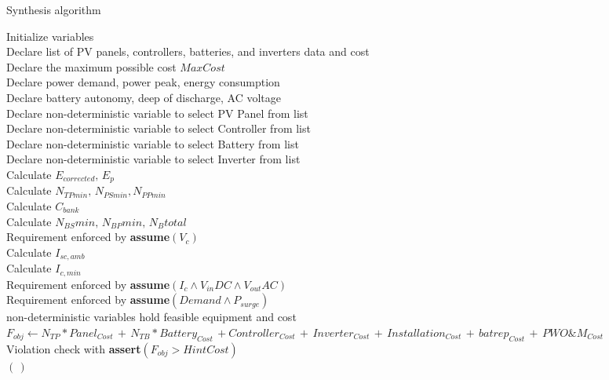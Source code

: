 \documentclass[journal]{IEEEtran}
\begin{document}
 \begin{algorithm}
 \caption{Synthesis algorithm}
 \begin{algorithmic}[1]
 \renewcommand{\algorithmicrequire}{\textbf{Input:}}
 \renewcommand{\algorithmicensure}{\textbf{Output:}}
  \STATE Initialize variables \\
  \STATE Declare list of PV panels, controllers, batteries, and inverters data and cost \\
  \STATE Declare the maximum possible cost $MaxCost$  \\
  \STATE Declare power demand, power peak, energy consumption \\
  \STATE Declare battery autonomy, deep of discharge, AC voltage \\
 	\STATE Declare non-deterministic variable to select PV Panel from list \\
 	\STATE Declare non-deterministic variable to select Controller from list \\
 	\STATE Declare non-deterministic variable to select Battery from list \\
 	\STATE Declare non-deterministic variable to select Inverter from list \\ 	
 	\STATE Calculate $E_{corrected}, \, E_{p} $ \\
	\STATE Calculate $N_{TPmin}, \, N_{PSmin}, N_{PPmin} $ \\
 	\STATE Calculate $C_{bank}$ \\
	\STATE Calculate $N_{BS}min, \, N_{BP}min, \, N_{B}total$ \\
	\STATE Requirement enforced by \textbf{assume}$(V_{c})$ \\
 	\STATE Calculate $I_{sc,amb}$ \\
 	\STATE Calculate $I_{c,min}$ \\
 	\STATE Requirement enforced by \textbf{assume}$(I_{c} \wedge V_{in}DC \wedge V_{out}AC)$ \\
	\STATE Requirement enforced by \textbf{assume}$(Demand \wedge P_{surge})$ \\
	\STATE non-deterministic variables hold feasible equipment and cost  \\
	\STATE $F_{obj} \leftarrow  N_{TP}*Panel_{Cost} \, + \, N_{TB}*Battery_{Cost} \, + Controller_{Cost} \, + \, Inverter_{Cost} \, + \, Installation_{Cost} \, + \, batrep_{Cost} \, + \, PWO\&M_{Cost}$ \\
	\STATE Violation check with \textbf{assert}$(F_{obj} > HintCost)$ \\
  \ENDFOR
 \RETURN $(\,)$ 
 \end{algorithmic} 
 \label{alg:verification-algorithm}
 \end{algorithm}
\end{document}
